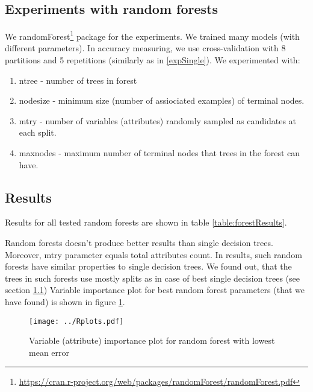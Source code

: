 \documentclass[a4paper]{article}
\begin{document}
\begin{multicols}{2}
\section{Experiments with random forests}
We randomForest\footnote{\url{https://cran.r-project.org/web/packages/randomForest/randomForest.pdf}} package for the experiments.
We trained many models (with different parameters).
In accuracy measuring, we use cross-validation with 8 partitions
and 5 repetitions (similarly as in \ref{expSingle}).
We experimented with:
\begin{enumerate}
    \item ntree - number of trees in forest
    \item nodesize - minimum size (number of assiociated examples) of terminal nodes.
    \item mtry - number of variables (attributes) randomly sampled as candidates at each split.
    \item maxnodes - maximum number of terminal nodes that trees in the forest can have.
\end{enumerate}

\subsection{Results}
\label{singleConc}
Results for all tested random forests are shown in table \ref{table:forestResults}.

Random forests doesn't produce better results than single decision trees.
Moreover, mtry parameter equals total attributes count.
In results, such random forests have similar properties to single decision trees.
We found out, that the trees in such forests use mostly splits as
in case of best single decision trees (see section \ref{singleConc})
Variable importance plot for best random forest parameters (that we have found)
is shown in figure \ref{fig:importance}.


\begin{figure}[H]
    \centering
    \texttt{[image: ../Rplots.pdf]}
    \label{fig:importance}
    \caption[]{Variable (attribute) importance plot for random forest with lowest mean error}
\end{figure}



\end{multicols}
\end{document}
